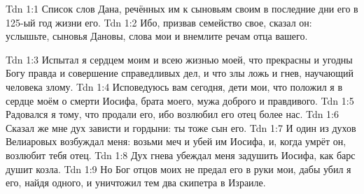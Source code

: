 \vs Tdn 1:1
Список слов Дана, речённых им к сыновьям своим
в последние дни его в 125-ый год жизни его.
\vs Tdn 1:2
Ибо, призвав семейство свое, сказал он:
услышьте, сыновья Дановы, слова мои и внемлите речам отца вашего.

\vs Tdn 1:3
Испытал я сердцем моим и всею жизнью моей,
что прекрасны и угодны Богу правда и совершение справедливых дел,
и что злы ложь и гнев, научающий человека злому.
\vs Tdn 1:4
Исповедуюсь вам сегодня, дети мои,
что положил я в сердце моём о смерти Иосифа, брата моего,
мужа доброго и правдивого.
\vs Tdn 1:5
Радовался я тому, что продали его, ибо возлюбил его отец более нас.
\vs Tdn 1:6
Сказал же мне дух зависти и гордыни: ты тоже сын его.
\vs Tdn 1:7
И один из духов Велиаровых возбуждал меня: возьми меч и убей им Иосифа,
и, когда умрёт он, возлюбит тебя отец.
\vs Tdn 1:8
Дух гнева убеждал меня задушить Иосифа, как барс душит козла.
\vs Tdn 1:9
Но Бог отцов моих не предал его в руки мои, дабы убил я его,
найдя одного, и уничтожил тем два скипетра в Израиле.

